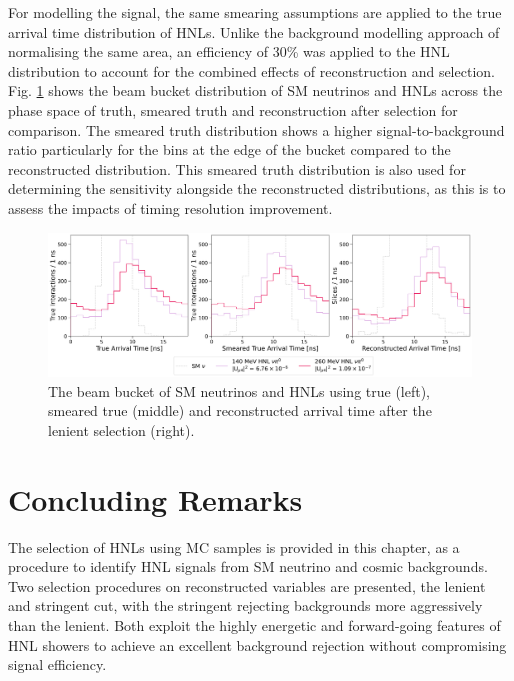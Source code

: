 For modelling the signal, the same smearing assumptions are applied to the true arrival time distribution of HNLs. 
Unlike the background modelling approach of normalising the same area, an efficiency of 30\% was applied to the HNL distribution to account for the combined effects of reconstruction and selection.
Fig. \ref{fig:hnl_sm_smear} shows the beam bucket distribution of SM neutrinos and HNLs across the phase space of truth, smeared truth and reconstruction after selection for comparison. 
The smeared truth distribution shows a higher signal-to-background ratio particularly for the bins at the edge of the bucket compared to the reconstructed distribution.
This smeared truth distribution is also used for determining the sensitivity alongside the reconstructed distributions, as this is to assess the impacts of timing resolution improvement.

\begin{figure}[ht!]
    \centering
    \includegraphics[width=\textwidth]{truth_smear_zoom.png}
    \caption[Beam Bucket Distributions of SM Neutrinos and HNLs Assuming an Improved Timing Resolution]{The beam bucket of SM neutrinos and HNLs using true (left), smeared true (middle) and reconstructed arrival time after the lenient selection (right).}
    \label{fig:hnl_sm_smear}
\end{figure}


\section{Concluding Remarks}
\label{sec:select_conclude}

The selection of HNLs using MC samples is provided in this chapter, as a procedure to identify HNL signals from SM neutrino and cosmic backgrounds.
Two selection procedures on reconstructed variables are presented, the lenient and stringent cut, with the stringent rejecting backgrounds more aggressively than the lenient.
Both exploit the highly energetic and forward-going features of HNL showers to achieve an excellent background rejection without compromising signal efficiency.


